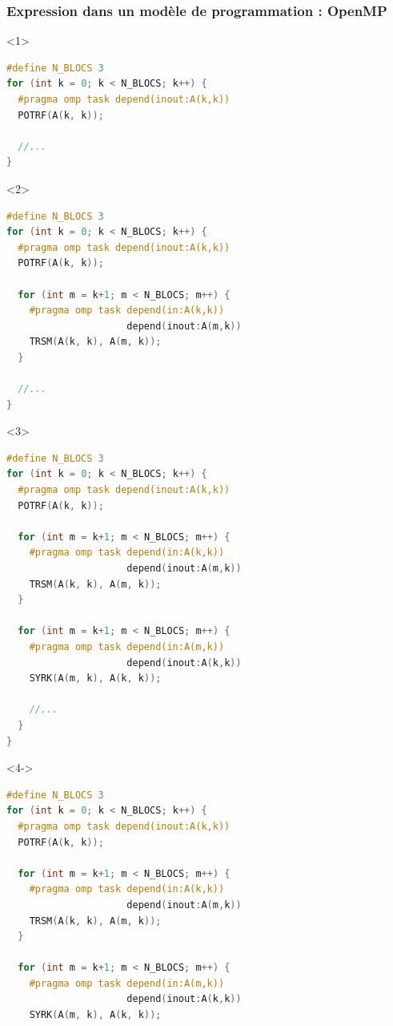 \documentclass[xcolor={usenames,dvipsnames,svgnames,table}, aspectratio=43]{beamer}
\begin{document}
\begin{frame}[fragile]
\frametitle{Expression dans un modèle de programmation : OpenMP}

\begin{minipage}[t]{0.52\linewidth}
  \vspace{0.3cm}
  \begin{onlyenv}<1>
  \begin{lstlisting}[language=c]
#define N_BLOCS 3
for (int k = 0; k < N_BLOCS; k++) {
  #pragma omp task depend(inout:A(k,k))
  POTRF(A(k, k));

  //...
}
  \end{lstlisting}
\end{onlyenv}
  \begin{onlyenv}<2>
  \begin{lstlisting}[language=c]
#define N_BLOCS 3
for (int k = 0; k < N_BLOCS; k++) {
  #pragma omp task depend(inout:A(k,k))
  POTRF(A(k, k));

  for (int m = k+1; m < N_BLOCS; m++) {
    #pragma omp task depend(in:A(k,k))
                     depend(inout:A(m,k))
    TRSM(A(k, k), A(m, k));
  }

  //...
}
  \end{lstlisting}
\end{onlyenv}
  \begin{onlyenv}<3>
  \begin{lstlisting}[language=c]
#define N_BLOCS 3
for (int k = 0; k < N_BLOCS; k++) {
  #pragma omp task depend(inout:A(k,k))
  POTRF(A(k, k));

  for (int m = k+1; m < N_BLOCS; m++) {
    #pragma omp task depend(in:A(k,k))
                     depend(inout:A(m,k))
    TRSM(A(k, k), A(m, k));
  }

  for (int m = k+1; m < N_BLOCS; m++) {
    #pragma omp task depend(in:A(m,k))
                     depend(inout:A(k,k))
    SYRK(A(m, k), A(k, k));

    //...
  }
}
  \end{lstlisting}
\end{onlyenv}
  \begin{onlyenv}<4->
  \begin{lstlisting}[language=c]
#define N_BLOCS 3
for (int k = 0; k < N_BLOCS; k++) {
  #pragma omp task depend(inout:A(k,k))
  POTRF(A(k, k));

  for (int m = k+1; m < N_BLOCS; m++) {
    #pragma omp task depend(in:A(k,k))
                     depend(inout:A(m,k))
    TRSM(A(k, k), A(m, k));
  }

  for (int m = k+1; m < N_BLOCS; m++) {
    #pragma omp task depend(in:A(m,k))
                     depend(inout:A(k,k))
    SYRK(A(m, k), A(k, k));


\end{lstlisting}
\end{onlyenv}
\end{minipage}
\end{frame}
\end{document}
